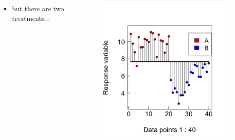 \documentclass{beamer}
\begin{document}
\begin{frame}{}
  \begin{columns}[onlytextwidth] %
    \begin{column}{0.44\textwidth}
  \begin{itemize}
    \item but there are two treatments...
  \end{itemize}
    \end{column}
    \hspace{0.02\textwidth} %
    \begin{column}{0.6\textwidth}
      \begin{center}
        \includegraphics[width=0.9\textwidth]{lectures/day_1_intro_to_mems/figures/unnamed-chunk-20-1.png}
      \end{center}
    \end{column}
  \end{columns}
\end{frame}
\end{document}
